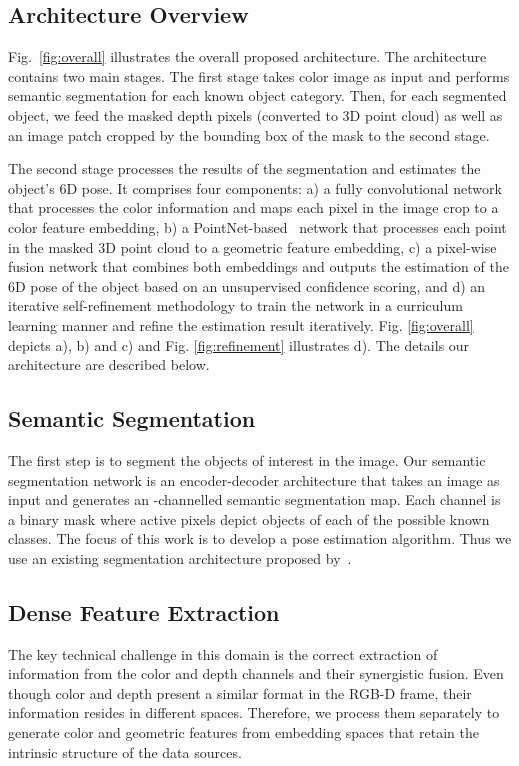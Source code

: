 \documentclass[10pt,twocolumn,letterpaper]{article}
\begin{document}
\subsection{Architecture Overview}
\label{sec::overview}

Fig.~\ref{fig:overall} illustrates the overall proposed architecture. The architecture contains two main stages. The first stage takes color image as input and performs semantic segmentation for each known object category. Then, for each segmented object, we feed the masked depth pixels (converted to 3D point cloud) as well as an image patch cropped by the bounding box of the mask to the second stage. 

The second stage processes the results of the segmentation and estimates the object's 6D pose. It comprises four components: a) a fully convolutional network that processes the color information and maps each pixel in the image crop to a color feature embedding, b) a PointNet-based~\cite{qi2016pointnet} network that processes each point in the masked 3D point cloud to a geometric feature embedding, c) a pixel-wise fusion network that combines both embeddings and outputs the estimation of the 6D pose of the object based on an unsupervised confidence scoring, and d) an iterative self-refinement methodology to train the network in a curriculum learning manner and refine the estimation result iteratively. Fig. \ref{fig:overall} depicts a), b) and c) and Fig. \ref{fig:refinement} illustrates d). The details our architecture are described below.

\subsection{Semantic Segmentation}
The first step is to segment the objects of interest in the image. Our semantic segmentation network is an encoder-decoder architecture that takes an image as input and generates an -channelled semantic segmentation map. Each channel is a binary mask where active pixels depict objects of each of the  possible known classes. The focus of this work is to develop a pose estimation algorithm. Thus we use an existing segmentation architecture proposed by~\cite{xiang2017posecnn}.

\subsection{Dense Feature Extraction}
\label{ssec::cpf}

The key technical challenge in this domain is the correct extraction of information from the color and depth channels and their synergistic fusion. Even though color and depth present a similar format in the RGB-D frame, their information resides in different spaces. Therefore, we process them separately to generate color and geometric features from embedding spaces that retain the intrinsic structure of the data sources.
\end{document}
